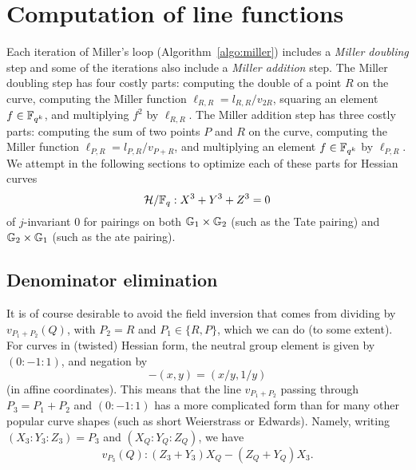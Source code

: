 \section{Computation of line functions}
\label{sec:lines}

Each iteration of Miller's loop (Algorithm~\ref{algo:miller}) includes a 
\emph{Miller doubling} step and some of the iterations also include a
\emph{Miller addition} step. 
The Miller doubling step has four costly parts:
computing the double of a point $R$ on the curve, computing the 
Miller function
$\ell_{R,R} = l_{R,R}/v_{2R}$, squaring an element $f \in \mathbb{F}_{q^k}$, 
and multiplying $f^2$ by $\ell_{R,R}$. 
The Miller addition step has three costly parts:
computing the sum of two points $P$ and $R$ on the curve, 
computing the Miller function
$\ell_{P,R} = l_{P,R}/v_{P+R}$,
and multiplying an element $f \in \mathbb{F}_{q^k}$ by $\ell_{P,R}$. 
We attempt in the following sections to optimize each of these parts
for
Hessian curves 
\[\mathcal{H}/\mathbb{F}_{q}: X^3 + Y^3 + Z^3 = 0\]
of $j$-invariant 0 
for pairings on both $\mathbb{G}_{1} \times \mathbb{G}_{2}$ (such as the Tate pairing)
and $\mathbb{G}_{2} \times \mathbb{G}_{1}$ (such as the ate pairing).


\subsection{Denominator elimination}\label{denelim}

It is of course desirable to avoid the field inversion that comes from dividing by 
$v_{P_1 + P_2}(Q)$, with $P_2 = R$ and $P_1 \in \{R,P\}$, which we can do (to some extent).
For curves in (twisted) Hessian form, the neutral group element is given by 
$(0:-1:1)$,
and negation by
\[-(x,y) = (x/y,1/y)\]
(in affine coordinates). 
This means that the line $v_{P_1 + P_2}$
passing through $P_3 = P_1 + P_2$ and $(0:-1:1)$ has a more complicated form than for many other popular curve shapes (such as
short Weierstrass or Edwards).
Namely, writing 
$(X_3:Y_3:Z_3) = P_3$ and $(X_Q:Y_Q:Z_Q)$, we have
\[v_{P_3}(Q): (Z_3 + Y_3)X_Q - (Z_Q+Y_Q)X_3.\]

